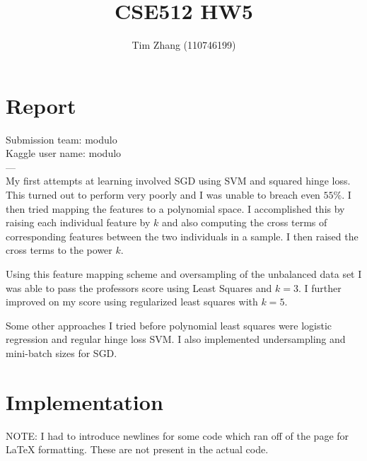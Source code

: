 \documentclass[11pt, oneside]{article}   	%
\title{CSE512 HW5}
\author{Tim Zhang (110746199)}
\date{}							%
\begin{document}
\maketitle

\DeclarePairedDelimiter{\norm}{\lVert}{\rVert}

\section{Report}
Submission team: modulo\\
Kaggle user name: modulo\\
---\\
My first attempts at learning involved SGD using SVM and squared hinge loss.  This turned out to perform very poorly and I was unable to breach even $55\%$.  I then tried mapping the features to a polynomial space.  I accomplished this by raising each individual feature by $k$ and also computing the cross terms of corresponding features between the two individuals in a sample.  I then raised the cross terms to the power $k$.

Using this feature mapping scheme and oversampling of the unbalanced data set I was able to pass the professors score using Least Squares and $k = 3$.  I further improved on my score using regularized least squares with $k = 5$.

Some other approaches I tried before polynomial least squares were logistic regression and regular hinge loss SVM.  I also implemented undersampling and mini-batch sizes for SGD.
\newpage{}
\section{Implementation}
NOTE: I had to introduce newlines for some code which ran off of the page for LaTeX formatting.  These are not present in the actual code.
\end{document}
